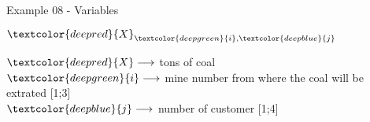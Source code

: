 \begin{frame}{Example 08 - Variables}
\begin{center}
\Huge{
$\textcolor{deepred}{X}_{\textcolor{deepgreen}{i}, \textcolor{deepblue}{j}}$
}
\end{center}
\large{
$\textcolor{deepred}  {X} \longrightarrow$
    tons of coal  \\ \vspace{1cm}
$\textcolor{deepgreen}{i} \longrightarrow$
    mine number from where the coal will be extrated [1;3] \\ \vspace{1cm}
$\textcolor{deepblue} {j} \longrightarrow$
    number of customer [1;4]
}
\end{frame}
